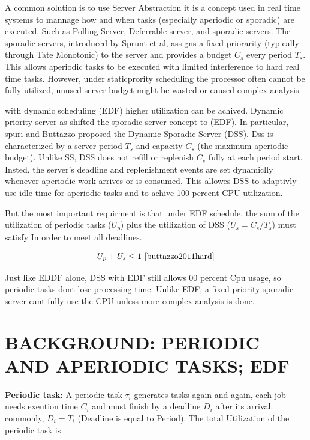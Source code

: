 \documentclass[conference]{IEEEtran}
\begin{document}
A common solution is to use Server Abstraction it is a concept used in real time systems to mannage how and when tasks (especially aperiodic or sporadic) are executed. Such as Polling Server, Deferrable server, and sporadic servers. The sporadic servers, introduced by Sprunt et al\cite{sprunt1989aperiodic}, assigns a fixed priorarity (typically through Tate Monotonic) to the server and provides a budget $C_s$ every period $T_s$. This allows aperiodic tasks to be executed with limited interference to hard real time tasks. However, under staticprority scheduling the processor often cannot be fully utilized, unused server budget might be wasted or caused complex analysis.

with dynamic scheduling (EDF) higher utilization can be achived. Dynamic priority server as shifted the sporadic server concept to (EDF). In particular, spuri and Buttazzo proposed the Dynamic Sporadic Server (DSS)\cite{spuri1994efficient}. Dss is characterized by a server period $T_s$ and capacity $C_s$ (the maximum aperiodic budget)\cite{buttazzo2011hard}. Unlike SS, DSS does not refill or replenish $C_s$ fully at each period start. Insted, the server's deadline and replenishment events are set dynamiclly whenever aperiodic work arrives or is consumed\cite{spuri1994efficient}. This allowes DSS to adaptivly use idle time for aperiodic tasks and to achive 100 percent CPU utilization. 

But the most important requirment is that under EDF schedule, the sum of the utilization of periodic tasks ($U_p$)\cite{buttazzo2011hard} plus the utilization of DSS ($U_s = C_s/T_s$)\cite{buttazzo2011hard} must satisfy In order to meet all deadlines\cite{spuri1994efficient}. 

\[
U_p + U_s \leq 1
   \ \cite{buttazzo2011hard} \]
   
Just like EDDF alone, DSS with EDF still allows 00 percent Cpu usage, so periodic tasks dont lose processing time. Unlike EDF, a fixed priority sporadic server cant fully use the CPU unless more complex analysis is done\cite{spuri1994efficient}.
   
\section{BACKGROUND: PERIODIC AND APERIODIC TASKS; EDF}
\textbf{Periodic task:} A periodic task $\tau_i$ generates tasks again and again, each job needs exeution time $C_i$ and must finish by a deadline $D_i$ after its arrival. commonly, $D_i = T_i$ (Deadline is equal to Period). The total Utilization of the periodic task is 
\end{document}

